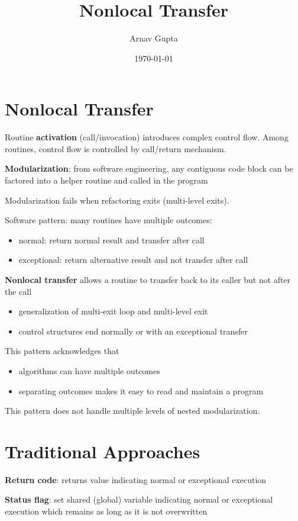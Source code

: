 \documentclass[11pt]{article}
\author{Arnav Gupta}
\date{\today}
\title{Nonlocal Transfer}
\begin{document}
\maketitle
\tableofcontents

\section{Nonlocal Transfer}
\label{sec:org1b4ac61}
Routine \textbf{activation} (call/invocation) introduces complex control flow.
Among routines, control flow is controlled by call/return mechanism.

\textbf{Modularization}: from software engineering, any contiguous code block can be factored into a helper
routine and called in the program

Modularization fails when refactoring exits (multi-level exits).

Software pattern: many routines have multiple outcomes:
\begin{itemize}
\item normal: return normal result and transfer after call
\item exceptional: return alternative result and not transfer after call
\end{itemize}

\textbf{Nonlocal transfer} allows a routine to transfer back to its caller but not after the call
\begin{itemize}
\item generalization of multi-exit loop and multi-level exit
\item control structures end normally or with an exceptional transfer
\end{itemize}

This pattern acknowledges that
\begin{itemize}
\item algorithms can have multiple outcomes
\item separating outcomes makes it easy to read and maintain a program
\end{itemize}

This pattern does not handle multiple levels of nested modularization.
\section{Traditional Approaches}
\label{sec:org857a01f}
\textbf{Return code}: returns value indicating normal or exceptional execution

\textbf{Status flag}: set shared (global) variable indicating normal or exceptional execution which remains
as long as it is not overwritten
\end{document}
